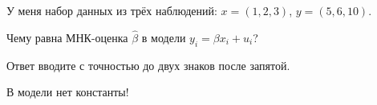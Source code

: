 
\begin{question}
У меня набор данных из трёх наблюдений: \(x = (1, 2, 3)\), \(y = (5, 6, 10)\).

Чему равна МНК-оценка \(\hat\beta\) в модели \(y_i = \beta x_i + u_i\)?

Ответ вводите с точностью до двух знаков после запятой.
\end{question}

\begin{solution}
В модели нет константы!
\end{solution}

